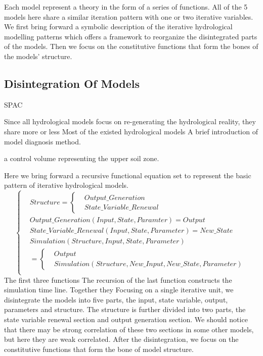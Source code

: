 Each model represent a theory in the form of a series of functions. All of the 5 models here share a similar iteration pattern with one or two iterative variables. We first bring forward a symbolic description of the iterative hydrological modelling patterns which offers a framework to reorganize the disintegrated parts of the models. Then we focus on the constitutive functions that form the bones of the models' structure. 

{\center\subsection{Disintegration Of Models}}
SPAC

Since all hydrological models focus on re-generating the hydrological reality, they share more or less  
Most of the existed hydrological models 
A brief introduction of model diagnosis method.

a control volume representing the upper soil zone.

Here we bring forward a recursive functional equation set to represent the basic pattern of iterative hydrological models. 
\begin{equation*}
\left\{
\begin{aligned}
   &Structure=\left\{\begin{aligned}&Output\_Generation\\&State\_Variable\_Renewal\end{aligned}\right.\\
   &Output\_Generation (Input,State,Paramter)=Output  \\
   &State\_Variable\_Renewal (Input,State,Parameter)=New\_State\\
   &Simulation(Structure,Input,State,Parameter)\\&=\left\{\begin{aligned}&Output\\&Simulation(Structure, New\_Input,New\_State,Parameter) \end{aligned}\right.\\
\end{aligned}
\right.
\end{equation*} 
The first three functions
The recursion of the last function constructs the simulation time line. Together they 
Focusing on a single iterative unit, we disintegrate the models into five parts, the input, state variable, output, parameters and structure. The structure is further divided into two parts, the  state variable renewal section and output generation section. We should notice that there may be strong correlation of these two sections in some other models, but here they are weak correlated. After the disintegration, we focus on the constitutive functions that form the bone of model structure.

